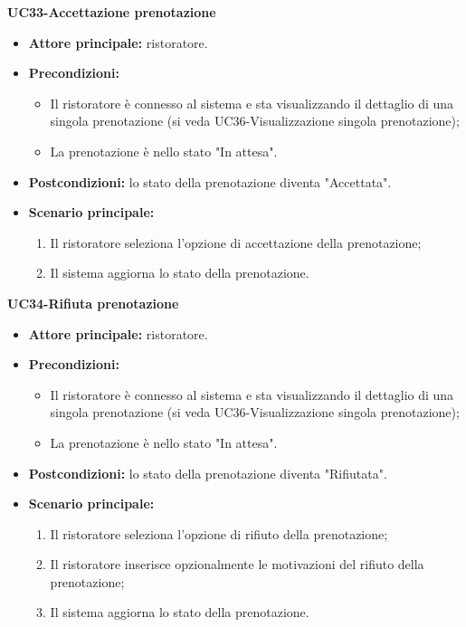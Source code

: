 \pagebreak
\textbf{UC33-Accettazione prenotazione}
\begin{itemize}
\item \textbf{Attore principale:} ristoratore.
\item \textbf{Precondizioni:} 
\begin{itemize}
        \item Il ristoratore è connesso al sistema e sta visualizzando il dettaglio di una singola prenotazione (si veda UC36-Visualizzazione singola prenotazione);
        \item La prenotazione è nello stato "In attesa".
\end{itemize}
\item \textbf{Postcondizioni:} lo stato della prenotazione diventa "Accettata".
\item \textbf{Scenario principale:}
\begin{enumerate}
    \item Il ristoratore seleziona l'opzione di accettazione della prenotazione;
    \item Il sistema aggiorna lo stato della prenotazione.
\end{enumerate}
\end{itemize}

\textbf{UC34-Rifiuta prenotazione}
\begin{itemize}
\item \textbf{Attore principale:} ristoratore.
\item \textbf{Precondizioni:} 
\begin{itemize}
        \item Il ristoratore è connesso al sistema e sta visualizzando il dettaglio di una singola prenotazione (si veda UC36-Visualizzazione singola prenotazione);
        \item La prenotazione è nello stato "In attesa".
\end{itemize}
\item \textbf{Postcondizioni:} lo stato della prenotazione diventa "Rifiutata".
\item \textbf{Scenario principale:}
\begin{enumerate}
    \item Il ristoratore seleziona l'opzione di rifiuto della prenotazione;
    \item Il ristoratore inserisce opzionalmente le motivazioni del rifiuto della prenotazione;
    \item Il sistema aggiorna lo stato della prenotazione.
\end{enumerate}
\end{itemize}

